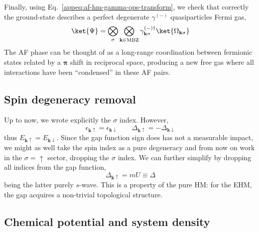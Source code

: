 Finally, using Eq.~\eqref{appeq:af-hm-gamma-ops-transform}, we check that correctly the ground-state describes a perfect degenerate $\gamma^{(-)}$ quasiparticles Fermi gas,
\begin{equation}\label{appeq:af-hm-gs-4}
	\ket{\Psi} = \bigotimes_\sigma \bigotimes_{\mathbf{k}\in\mathrm{MBZ}} \gamma_{\mathbf{k}\sigma}^{(-)\dagger} \ket{\Omega_{\mathbf{k}\sigma}}
\end{equation}
The AF phase can be thought of as a long-range coordination between fermionic states related by a $\bm{\pi}$ shift in reciprocal space, producing a new free gas where all interactions have been ``condensed'' in these AF pairs.

\subsection{Spin degeneracy removal}

Up to now, we wrote explicitly the $\sigma$ index. However,
\[
	\epsilon_{\mathbf{k}\uparrow} = \epsilon_{\mathbf{k}\downarrow}
	\qquad
	\Delta_{\mathbf{k}\uparrow} = -\Delta_{\mathbf{k}\downarrow}
\]
thus $E_{\mathbf{k}\uparrow} = E_{\mathbf{k}\downarrow}$. Since the gap function sign does has not a measurable impact, we might as well take the spin index as a pure degeneracy and from now on work in the $\sigma=\uparrow$ sector, dropping the $\sigma$ index. We can further simplify by dropping all indices from the gap function,
\[
	\Delta_{\mathbf{k}\uparrow} = mU \equiv \Delta
\]
being the latter purely $s$-wave. This is a property of the pure HM: for the EHM, the gap acquires a non-trivial topological structure.

\subsection{Chemical potential and system density}

